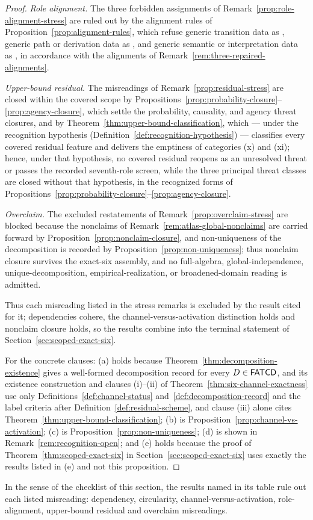 \begin{proof}
\emph{Role alignment.} The three forbidden assignments of
Remark~\ref{prop:role-alignment-stress} are ruled out by the alignment
rules of Proposition~\ref{prop:alignment-rules}, which refuse generic
transition data as \Pthree{}, generic path or derivation data as
\Pfive{}, and generic semantic or interpretation data as \Pone{}, in
accordance with the alignments of
Remark~\ref{rem:three-repaired-alignments}.

\emph{Upper-bound residual.} The misreadings of
Remark~\ref{prop:residual-stress} are closed within the covered scope by
Propositions~\ref{prop:probability-closure}--\ref{prop:agency-closure},
which settle the probability, causality, and agency threat closures, and
by Theorem~\ref{thm:upper-bound-classification}, which --- under the
recognition hypothesis (Definition~\ref{def:recognition-hypothesis}) ---
classifies every covered residual feature and delivers the emptiness of
categories (x) and (xi); hence, under that hypothesis, no covered residual
reopens as an unresolved threat or passes the recorded seventh-role screen, while the
three principal threat classes are closed without that hypothesis, in the
recognized forms of
Propositions~\ref{prop:probability-closure}--\ref{prop:agency-closure}.

\emph{Overclaim.} The excluded restatements of
Remark~\ref{prop:overclaim-stress} are blocked because the nonclaims of
Remark~\ref{rem:atlas-global-nonclaims} are carried forward by
Proposition~\ref{prop:nonclaim-closure}, and non-uniqueness of the
decomposition is recorded by Proposition~\ref{prop:non-uniqueness}; thus
nonclaim closure survives the exact-six assembly, and no full-algebra,
global-independence, unique-decomposition, empirical-realization, or
broadened-domain reading is admitted.

Thus each misreading listed in the stress remarks is excluded by the result
cited for it; dependencies cohere, the channel-versus-activation distinction
holds and nonclaim closure holds, so the results combine into the terminal
statement of
Section~\ref{sec:scoped-exact-six}.

For the concrete clauses: (a) holds because Theorem~\ref{thm:decomposition-existence}
gives a well-formed decomposition record for every \(D\in\mathsf{FATCD}{}\), and its
existence construction and clauses (i)--(ii) of
Theorem~\ref{thm:six-channel-exactness} use only
Definitions~\ref{def:channel-status} and~\ref{def:decomposition-record} and the
label criteria after Definition~\ref{def:residual-scheme}, and clause (iii)
alone cites Theorem~\ref{thm:upper-bound-classification}; (b) is
Proposition~\ref{prop:channel-vs-activation}; (c) is
Proposition~\ref{prop:non-uniqueness}; (d) is shown in
Remark~\ref{rem:recognition-open}; and (e) holds because the proof of
Theorem~\ref{thm:scoped-exact-six} in Section~\ref{sec:scoped-exact-six} uses exactly
the results listed in (e) and not this proposition.
\end{proof}

In the sense of the checklist of this section, the results named in its table
rule out each listed misreading: dependency, circularity,
channel-versus-activation, role-alignment, upper-bound residual and overclaim
misreadings.
